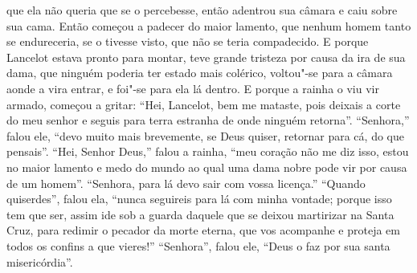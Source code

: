 que ela não queria que se o percebesse, então adentrou sua câmara e caiu sobre
sua cama. Então começou a padecer do maior lamento, que nenhum homem tanto se
endureceria, se o tivesse visto, que não se teria compadecido. E porque
Lancelot estava pronto para montar, teve grande tristeza por causa da ira de
sua dama, que ninguém poderia ter estado mais colérico, voltou"-se para a câmara
aonde a vira entrar, e foi"-se para ela lá dentro. E porque a rainha o viu vir
armado, começou a gritar: “Hei, Lancelot, bem me mataste, pois deixais a corte
do meu senhor e seguis para terra estranha de onde ninguém retorna”. “Senhora,”
falou ele, “devo muito mais brevemente, se Deus quiser, retornar para cá, do
que pensais”. “Hei, Senhor Deus,” falou a rainha, “meu coração não me diz isso,
estou no maior lamento e medo do mundo ao qual uma dama nobre pode vir por
causa de um homem”. “Senhora, para lá devo sair com vossa licença.” “Quando
quiserdes”, falou ela, “nunca seguireis para lá com minha vontade; porque isso
tem que ser, assim ide sob a guarda daquele que se deixou martirizar na Santa
Cruz, para redimir o pecador da morte eterna, que vos acompanhe e proteja em
todos os confins a que vieres!” “Senhora”, falou ele, “Deus o faz por sua
santa misericórdia”. 

